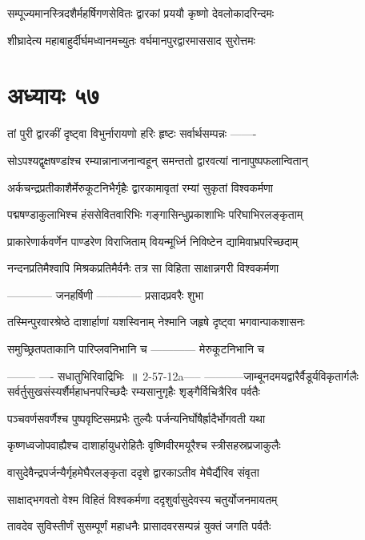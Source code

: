\twolineshloka
{सम्पूज्यमानस्त्रिदशैर्महर्षिगणसेवितः}
{द्वारकां प्रययौ कृष्णो देवलोकादरिन्दमः}


\twolineshloka
{शीघ्रादेत्य महाबाहुर्दीर्घमध्वानमच्युतः}
{वर्घमानपुरद्वारमाससाद सुरोत्तमः}


\chapter{अध्यायः ५७}
\twolineshloka
{तां पुरी द्वारकीं दृष्ट्वा विभुर्नारायणो हरिः}
{हृष्टः सर्वार्थसम्पन्नः -------}


\twolineshloka
{सोऽपश्यद्वृक्षषण्डांश्च रम्यान्नानाजनान्वहून्}
{समन्ततो द्वारवत्यां नानापुष्पफलान्वितान्}


\twolineshloka
{अर्कचन्द्रप्रतीकाशैर्मेरुकूटनिभैर्गृहैः}
{द्वारकामावृतां रम्यां सुकृतां विश्वकर्मणा}


\twolineshloka
{पद्मषण्डाकुलाभिश्च हंससेवितवारिभिः}
{गङ्गासिन्धुप्रकाशाभिः परिघाभिरलङ्कृताम्}


\twolineshloka
{प्राकारेणार्कवर्णेन पाण्डरेण विराजिताम्}
{वियन्मूर्ध्नि निविष्टेन द्यामिवाभ्रपरिच्छदाम्}


\twolineshloka
{नन्दनप्रतिमैश्वापि मिश्रकप्रतिमैर्वनैः}
{तत्र सा विहिता साक्षान्नगरी विश्वकर्मणा}


\twolineshloka
{------------ जनहर्षिणी}
{------------ प्रसादप्रवरैः शुभा}


\twolineshloka
{तस्मिन्पुरवारश्रेष्ठे दाशार्हाणां यशस्विनाम्}
{नेश्मानि जहृषे दृष्ट्वा भगवान्पाकशासनः}


\twolineshloka
{समुच्छ्रितपताकानि पारिप्लवनिभानि च}
{------------ मेरुकूटनिभानि च}


--------
---- सधातुभिरिवाद्रिभिः ॥ 2-57-12a----- -----------जाम्बूनदमयद्वारैर्वैडूर्यविकृतार्गलैः
\twolineshloka
{सर्वर्तुसुखसंस्यर्शैर्महाधनपरिच्छदैः}
{रम्यसानुगृहैः शृङ्गैर्विचित्रैरिव पर्वतैः}


\twolineshloka
{पञ्चवर्णसवर्णैश्च पुष्पवृष्टिसमप्रभैः}
{तुल्यैः पर्जन्यनिर्घोषैर्ह्रादैर्भोगवती यथा}


\twolineshloka
{कृष्णध्वजोपवाह्यैश्च दाशार्हायुधरोहितैः}
{वृष्णिवीरमयूरैश्च स्त्रीसहस्रप्रजाकुलैः}


\twolineshloka
{वासुदेवैन्द्रपर्जन्यैर्गृहमेघैरलङ्कृता}
{ददृशे द्वारकाऽतीव मेघैर्द्यैरिव संवृता}


\twolineshloka
{साक्षाद्भगवतो वेश्म विहितं विश्वकर्मणा}
{ददृशुर्वासुदेवस्य चतुर्योजनमायतम्}


\twolineshloka
{तावदेव सुविस्तीर्णं सुसम्पूर्णं महाधनैः}
{प्रासादवरसम्पन्नं युक्तं जगति पर्वतैः}


